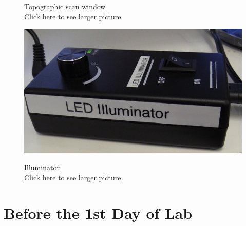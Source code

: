 \documentclass{../lab}
\begin{document}
\begin{figure}[H]
  \caption{Topographic scan window \\
  \href{http://experimentationlab.berkeley.edu/sites/default/files/AFMImages/toposcan.JPG}{Click here to see larger picture}}
  \label{fig:TopoScan}
\endminipage\hfill
{}
  \href{http://experimentationlab.berkeley.edu/sites/default/files/AFMImages/LED2.jpg}{\includegraphics[width=\linewidth,keepaspectratio]{images/LED2.jpg}}
  \caption{Illuminator \\ \href{http://experimentationlab.berkeley.edu/sites/default/files/AFMImages/LED2.jpg}{Click here to see larger picture}}\label{fig:Illuminator}
\endminipage
\end{figure}

\section{Before the 1st Day of Lab }
\end{document}
